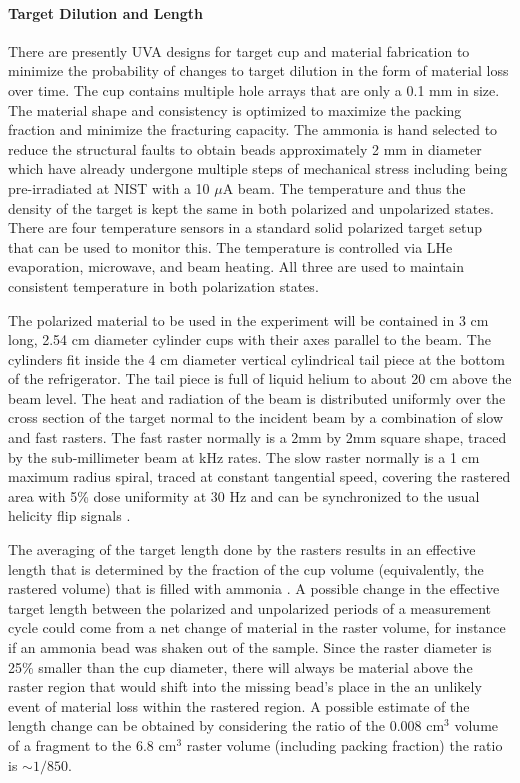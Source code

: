 \paragraph{Target Dilution and Length}

There are presently UVA designs for target cup and material fabrication to minimize the probability
of changes to target dilution in the form of material loss over time.  The cup contains
multiple hole arrays that are only a 0.1 mm in size.  The material shape and consistency 
is optimized to maximize the packing fraction and minimize the fracturing capacity.  The
ammonia is hand selected to reduce the structural faults to obtain beads approximately 
2 mm in diameter which have already undergone multiple steps of mechanical stress including being pre-irradiated at NIST with a 10 $\mu$A beam.  The temperature
and thus the density of the target is kept the same
in both polarized and unpolarized states.  There are four temperature sensors in a
standard solid polarized target setup that can be used to monitor this.  The temperature
is controlled via LHe evaporation, microwave, and beam heating.  All three are used
to maintain consistent temperature in both polarization states.

The polarized material to be used in the experiment will be contained in 3 cm 
long, 2.54 cm diameter cylinder cups with their axes parallel to the beam.
The cylinders fit inside the 4 cm diameter vertical cylindrical tail piece at 
the bottom of the refrigerator.  The tail piece is full of liquid helium to 
about 20 cm above the beam level.  The heat and radiation of the beam is distributed
uniformly over the cross section of the target normal to the incident beam by a combination
of slow and fast rasters. The fast raster normally is a 2mm by 2mm square shape, traced by the 
sub-millimeter beam at kHz rates.  The slow raster normally is a 1 cm maximum radius spiral, traced at constant tangential speed, covering the rastered area with 5\% dose uniformity at 30 Hz
and can be synchronized to the usual helicity flip signals \cite{chenyan}.

The averaging of the target length done by the rasters results in an effective 
length that is determined by the fraction of the cup volume 
(equivalently, the rastered volume) that is filled with ammonia \cite{chenyan}.
A possible change in the effective target length between the polarized and 
unpolarized periods of a measurement cycle could come from a net change of 
material in the raster volume, for instance if an ammonia bead was shaken out of the sample. Since the raster diameter is 25\% smaller than 
the cup diameter, there will always be material above the raster region that would shift into the missing bead's place in the an unlikely event of material loss within the rastered region.
A possible estimate of the length change can be obtained by considering the 
ratio of the 0.008 cm$^3$ volume of a fragment to the 6.8 cm$^3$ raster volume 
(including packing fraction) the ratio is $\sim 1/850$.

